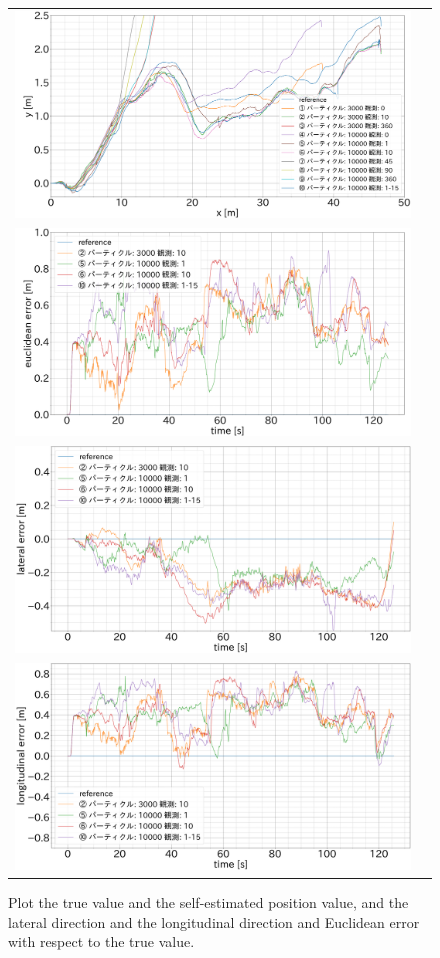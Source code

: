 \documentclass{jarticle}
\begin{document}
\begin{figure}[htbp]
  \begin{center}
  \begin{tabular}{cc}
  \includegraphics[width=0.8\linewidth]{fig/x_y.png} \\
  \includegraphics[width=0.8\linewidth]{fig/euclidean_error.png} \\
  \includegraphics[width=0.8\linewidth]{fig/lateral_error.png} \\
  \includegraphics[width=0.8\linewidth]{fig/longitudinal_error.png} 
  \end{tabular}
  \caption{
    Plot the true value and the self-estimated position value,
     and the lateral direction and the longitudinal 
    direction and Euclidean error with respect to the true value.}
  \label{fig:plot}
  \end{center}
\end{figure}
\end{document}
